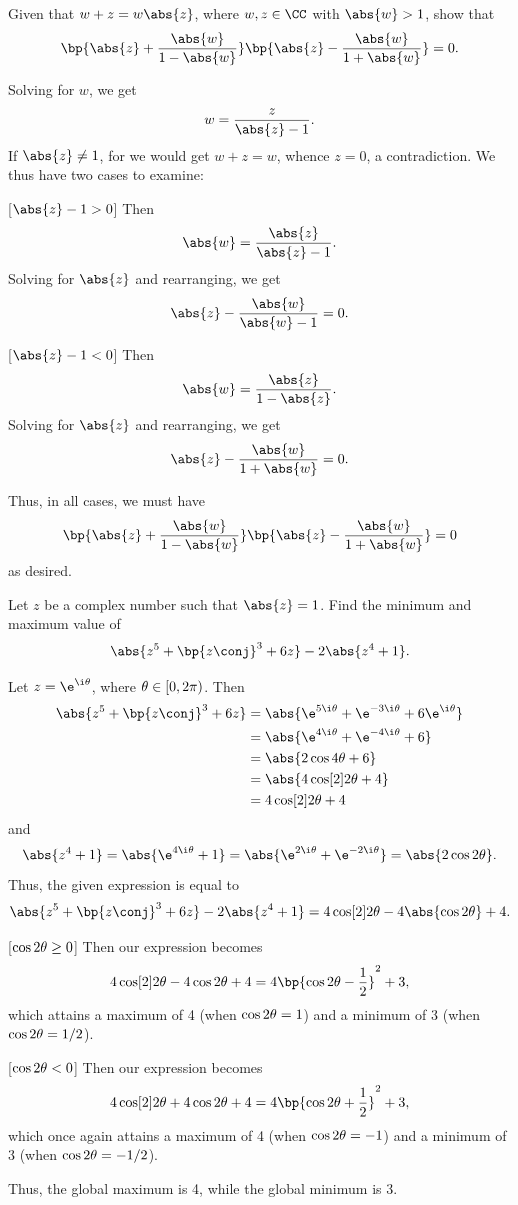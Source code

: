 \begin{problem}
    Given that $w + z = w\abs{z}$, where $w, z \in \CC$ with $\abs{w} > 1$, show that \[\bp{\abs{z} + \frac{\abs{w}}{1 - \abs{w}}}\bp{\abs{z} - \frac{\abs{w}}{1 + \abs{w}}} = 0.\]
\end{problem}
\begin{solution}
    Solving for $w$, we get \[w = \frac{z}{\abs{z} - 1}.\] If $\abs{z} \neq 1$, for we would get $w + z = w$, whence $z = 0$, a contradiction. We thus have two cases to examine:

    [$\abs{z} - 1 > 0$] Then \[\abs{w} = \frac{\abs{z}}{\abs{z} - 1}.\] Solving for $\abs{z}$ and rearranging, we get \[\abs{z} - \frac{\abs{w}}{\abs{w} - 1} = 0.\]

    [$\abs{z} - 1 < 0$] Then \[\abs{w} = \frac{\abs{z}}{1 - \abs{z}}.\] Solving for $\abs{z}$ and rearranging, we get \[\abs{z} - \frac{\abs{w}}{1 + \abs{w}} = 0.\]

    Thus, in all cases, we must have \[\bp{\abs{z} + \frac{\abs{w}}{1 - \abs{w}}}\bp{\abs{z} - \frac{\abs{w}}{1 + \abs{w}}} = 0\] as desired.
\end{solution}

\begin{problem}
    Let $z$ be a complex number such that $\abs{z} = 1$. Find the minimum and maximum value of \[\abs{z^5 + \bp{z\conj}^3 + 6z} - 2\abs{z^4 + 1}.\]
\end{problem}
\begin{solution}
    Let $z = \e^{\i \t}$, where $\theta \in [0, 2\pi)$. Then
    \begin{align*}
        \abs{z^5 + \bp{z\conj}^3 + 6z} &= \abs{\e^{5 \i \t} + \e^{-3 \i \t} + 6\e^{\i \t}}\\
        &= \abs{\e^{4\i \t} + \e^{-4\i \t} + 6}\\
        &= \abs{2\cos{4\t} + 6}\\
        &= \abs{4\cos[2]{2\t} + 4}\\
        &= 4\cos[2]{2\t} + 4
    \end{align*}
    and \[\abs{z^4 + 1} = \abs{\e^{4\i \t} + 1} = \abs{\e^{2\i\t} + \e^{-2\i\t}} = \abs{2\cos{2\t}}.\] Thus, the given expression is equal to \[\abs{z^5 + \bp{z\conj}^3 + 6z} - 2\abs{z^4 + 1} = 4\cos[2]{2\t} - 4\abs{\cos{2\t}} + 4.\]

    [$\cos{2\theta} \geq 0$] Then our expression becomes \[4\cos[2]{2\t} - 4\cos{2\t} + 4 = 4\bp{\cos{2\t} - \frac12}^2 + 3,\] which attains a maximum of 4 (when $\cos{2\theta} = 1$) and a minimum of 3 (when $\cos{2\theta} = 1/2$).

    [$\cos{2\theta} < 0$] Then our expression becomes \[4\cos[2]{2\t} + 4\cos{2\t} + 4 = 4\bp{\cos{2\t} + \frac12}^2 + 3,\] which once again attains a maximum of 4 (when $\cos{2\theta} = -1$) and a minimum of 3 (when $\cos{2\theta} = -1/2$).

    Thus, the global maximum is 4, while the global minimum is 3.
\end{solution}


